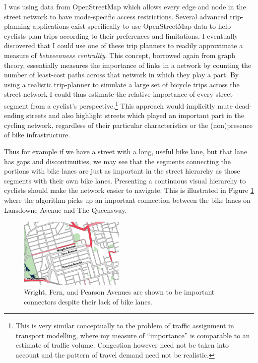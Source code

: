 \documentclass{article}
\begin{document}
		I was using data from OpenStreetMap which allows every edge and node in the street network to have mode-specific access restrictions. Several advanced trip-planning applications exist specifically to use OpenStreetMap data to help cyclists plan trips according to their preferences and limitations. I eventually discovered that I could use one of these trip planners to readily approximate a measure of \textit{betweenness centrality}. This concept, borrowed again from graph theory, essentially measures the importance of links in a network by counting the number of least-cost paths across that network in which they play a part. 
		By using a realistic trip-planner to simulate a large set of bicycle trips across the street network I could thus estimate the relative importance of every street segment from a cyclist's perspective.\footnote{
			This is very similar conceptually to the problem of traffic assignment in transport modelling, where my measure of ``importance'' is comparable to an estimate of traffic volume. Congestion however need not be taken into account and the pattern of travel demand need not be realistic. 
		}
		This approach would implicitly mute dead-ending streets and also highlight streets which played an important part in the cycling network, regardless of their particular characteristics or the (non)presence of bike infrastructure. 
		
		Thus for example if we have a street with a long, useful bike lane, but that lane has gaps and discontinuities, we may see that the segments connecting the portions with bike lanes are just as important in the street hierarchy as those segments with their own bike lanes. Presenting a continuous visual hierarchy to cyclists should make the network easier to navigate. This is illustrated in Figure \ref{fig:spanned-gap} where the algorithm picks up an important connection between the bike lanes on Lansdowne Avenue and The Queensway. 
		\begin{figure}[h!]
			\centering
			\includegraphics[width=0.45\textwidth]{spanned-gap}
			\caption{Wright, Fern, and Pearson Avenues are shown to be important connectors despite their lack of {\color{red}bike lanes}.}
			\label{fig:spanned-gap}
		\end{figure}
	
\end{document}
